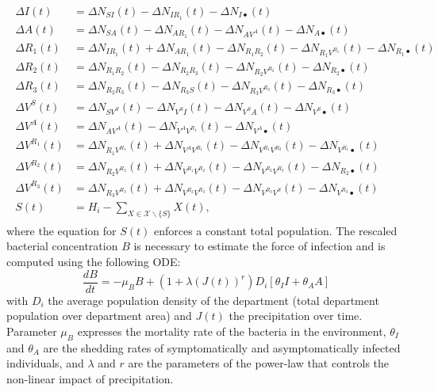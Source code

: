 \begin{gather}
\label{eq:stochstates}
\begin{aligned}
    \Delta I(t) &= \Delta N_{SI}(t) -  \Delta N_{IR_1}(t) -  \Delta N_{I\bullet}(t)\\
    \Delta A(t) &= \Delta N_{SA}(t) -  \Delta N_{AR_1}(t) -  \Delta N_{AV^A}(t) - \Delta N_{A\bullet}(t)\\
    \Delta R_1(t) &= \Delta N_{IR_1}(t) + \Delta N_{AR_1}(t) -  \Delta N_{R_1 R_2}(t) -  \Delta N_{R_1V^{R_1}}(t) -  \Delta N_{R_1\bullet}(t)\\
    \Delta R_2(t) &= \Delta N_{R_1R_2}(t) - \Delta N_{R_2 R_3}(t) -  \Delta N_{R_2V^{R_2}}(t) -  \Delta N_{R_2\bullet}(t)\\
    \Delta R_3(t) &= \Delta N_{R_2R_3}(t) - \Delta N_{R_3 S}(t) -  \Delta N_{R_3V^{R_3}}(t) -  \Delta N_{R_3\bullet}(t)\\
    \Delta V^S(t) &= \Delta N_{SV^S}(t) -  \Delta N_{V^S I}(t)-  \Delta N_{V^S A}(t) - \Delta N_{V^S\bullet}(t)\\
    \Delta V^A(t) &= \Delta N_{AV^A}(t) -  \Delta N_{V^AV^{R_1}}(t) - \Delta N_{V^A\bullet}(t)\\
    \Delta V^{R_1}(t) &= \Delta N_{R_1V^{R_1}}(t) +  \Delta N_{V^AV^{R_1}}(t) - \Delta N_{V^{R_1}V^{R_2}}(t) - \Delta N_{V^{R_1}\bullet}(t)\\
    \Delta V^{R_2}(t) &=\Delta N_{R_2V^{R_2}}(t)+\Delta N_{V^{R_1} V^{R_2}}(t) -  \Delta N_{V^{R_2}V^{R_3}}(t) -  \Delta N_{R_2\bullet}(t)\\
    \Delta V^{R_3}(t) &= \Delta N_{R_3V^{R_3}}(t)+\Delta N_{V^{R_2}V^{R_3}}(t) - \Delta N_{V^{R_3}V^ S}(t) - \Delta N_{V^{R_3}\bullet}(t)\\
    S(t) &= H_i - \sum_{X \in \mathcal{X} \backslash \{S\}} X(t),
\end{aligned}
\end{gather}
where the equation for $S(t)$ enforces a constant total population. 
The rescaled bacterial concentration $B$ is necessary to estimate the force of infection and is computed using the following ODE:
\begin{equation}
\frac{dB}{dt} = - \mu_B B +  \left(1 + \lambda\left( J(t)\right)^{r} \right)  D_i \left[\theta_I I + \theta_A A\right] 
\end{equation}
with $D_i$ the average population density of the department (total department population over department area) and $J(t)$ the precipitation over time. Parameter $\mu_B$ expresses the mortality rate of the bacteria in the environment, $\theta_I$ and $\theta_A$ are the shedding rates of symptomatically and asymptomatically infected individuals, and $\lambda$ and $r$ are the parameters of the power-law that controls the non-linear impact of precipitation.


